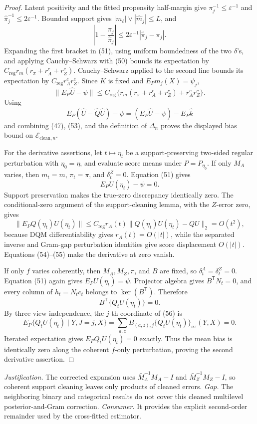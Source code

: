 \documentclass{article}
\begin{document}
\begin{proof}
Latent positivity and the fitted propensity half-margin give
\(\pi_j^{-1}\leq\varepsilon^{-1}\) and \(\widehat\pi_j^{-1}\leq2\varepsilon^{-1}\).  Bounded support gives \(|m_\ell|\vee|\widehat m_j|\leq L\), and
\[
 \left|1-\frac{\pi_j}{\widehat\pi_j}\right|
 \leq2\varepsilon^{-1}|\widehat\pi_j-\pi_j|. \tag{52}
\]
Expanding the first bracket in (51), using uniform boundedness of the two \(\delta\)'s, and applying Cauchy--Schwarz with (50) bounds its expectation by
\(C_{\mathrm{reg}}r_m(r_\pi+r_A^c+r_Z^c)\).  Cauchy--Schwarz applied to the second line bounds its expectation by \(C_{\mathrm{reg}}r_A^cr_Z^c\).  Since \(K\) is fixed and \(E_Pm_j(X)=\psi_j\),
\[
 \|E_P\widehat U-\psi\|
 \leq C_{\mathrm{reg}}
 \{r_m(r_\pi+r_A^c+r_Z^c)+r_A^cr_Z^c\}. \tag{53}
\]
Using
\[
E_P(\widehat U-\widehat Q\widehat U)-\psi
=(E_P\widehat U-\psi)-E_P\widehat k
\]
and combining (47), (53), and the definition of \(\Delta_n\) proves the displayed bias bound on \(\mathcal E_{\mathrm{clean},n}\).

For the derivative assertions, let \(t\mapsto\eta_t\) be a support-preserving two-sided regular perturbation with \(\eta_0=\eta\), and evaluate score means under \(P=P_{\eta_0}\).  If only \(M_A\) varies, then \(m_t=m\), \(\pi_t=\pi\), and \(\delta_t^Z=0\).  Equation (51) gives
\[
 E_PU(\eta_t)-\psi=0. \tag{54}
\]
Support preservation makes the true-zero discrepancy identically zero.  The conditional-zero argument of the support-cleaning lemma, with the \(Z\)-error zero, gives
\[
 \|E_PQ(\eta_t)U(\eta_t)\|
 \leq C_{\mathrm{reg}}r_A(t)
 \|Q(\eta_t)U(\eta_t)-QU\|_2=O(t^2), \tag{55}
\]
because DQM differentiability gives \(r_A(t)=O(|t|)\), while the separated inverse and Gram-gap perturbation identities give score displacement \(O(|t|)\).  Equations (54)--(55) make the derivative at zero vanish.

If only \(f\) varies coherently, then \(M_A,M_Z,\pi\), and \(B\) are fixed, so
\(\delta_t^A=\delta_t^Z=0\).  Equation (51) again gives \(E_PU(\eta_t)=\psi\).  Projector algebra gives \(B^{\mathsf T}N_t=0\), and every column of \(h_t=N_tc_t\) belongs to \(\ker(B^{\mathsf T})\).  Therefore
\[
 B^{\mathsf T}\{Q_tU(\eta_t)\}=0. \tag{56}
\]
By three-view independence, the \(j\)-th coordinate of (56) is
\[
 E_P\{Q_tU(\eta_t)\mid Y,J=j,X\}
 =\sum_{a,z}B_{(a,z),j}\{Q_tU(\eta_t)\}_{az}(Y,X)=0.
\]
Iterated expectation gives \(E_PQ_tU(\eta_t)=0\) exactly.  Thus the mean bias is identically zero along the coherent \(f\)-only perturbation, proving the second derivative assertion.
\end{proof}
\par\smallskip\noindent \textit{Justification.} The corrected expansion uses \(\bar M_A^{-1}M_A-I\) and \(\bar M_Z^{-1}M_Z-I\), so coherent support cleaning leaves only products of cleaned errors. \textit{Gap.} The neighboring binary and categorical results do not cover this cleaned multilevel posterior-and-Gram correction. \textit{Consumer.} It provides the explicit second-order remainder used by the cross-fitted estimator.
\end{document}
